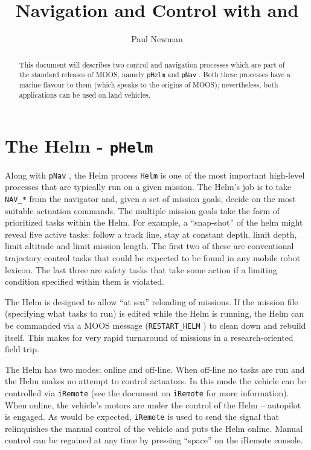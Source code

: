 \documentclass[a4paper,10pt]{article}
\title{Navigation and Control with \code{pNav} and \code{pHelm}}
\author{Paul Newman}
\newcommand{\Code}[1]{\texttt{#1} }
\newcommand{\code}[1]{\Code{#1} }
\begin{document}
\maketitle

\begin{center}
\end{center}
\begin{abstract}
This document will  describes two  control and navigation processes which are part of the standard
releases of MOOS, namely \code{pHelm} and \code{pNav}. Both these processes have a marine flavour to them (which speaks to the origins of MOOS); nevertheless, both applications can be used on land vehicles.
\end{abstract}

\section{ The Helm - \code{pHelm}}
Along with \code{pNav}, the Helm process \code{Helm} is one of the
most important high-level processes that are typically run on a
given mission. The Helm's job is to take \code{NAV\_*} from the
navigator and, given a set of mission goals, decide on the most
suitable actuation commands. The multiple mission goals take the
form of prioritized tasks within the Helm. For example, a
``snap-shot'' of the helm might reveal five active tasks: follow a
track line, stay at constant depth, limit depth, limit altitude
and limit mission length. The first two of these are conventional
trajectory control tasks that could be expected to be found in any
mobile robot lexicon. The last three are safety tasks that
take some action if a limiting condition specified within them is
violated.

The Helm is designed to allow ``at sea'' reloading of missions. If
the mission file (specifying what tasks to run) is edited while
the Helm is running, the Helm can be commanded via a MOOS message
(\code{RESTART\_HELM}) to clean down and rebuild itself. This
makes for very rapid turnaround of missions in a research-oriented
field trip.

The Helm has two modes: online and off-line. When off-line no
tasks are run and the Helm makes no attempt to control actuators.
In this mode the vehicle can be controlled via \code{iRemote} (see
the document on \code{iRemote} for more information). When online, the vehicle's motors are under the
control of the Helm -- autopilot is engaged. As would be expected,
\code{iRemote} is used to send the signal that relinquishes the
manual control of the vehicle and puts the Helm online. Manual
control can be regained at any time by pressing ``space'' on the
iRemote console.
\end{document}
